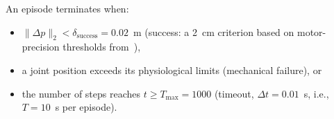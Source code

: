 An episode terminates when:
\begin{itemize}
  \item $\|\Delta p\|_2 < \delta_\text{success} = 0.02$~m (success: a
        \SI{2}{\centi\meter} criterion based on motor-precision thresholds
        from~\parencite{Flash1985}),
  \item a joint position exceeds its physiological limits (mechanical
        failure), or
  \item the number of steps reaches $t \geq T_\text{max} = 1000$ (timeout,
        $\Delta t = 0.01$~s, i.e., $T = 10$~s per episode).
\end{itemize}

